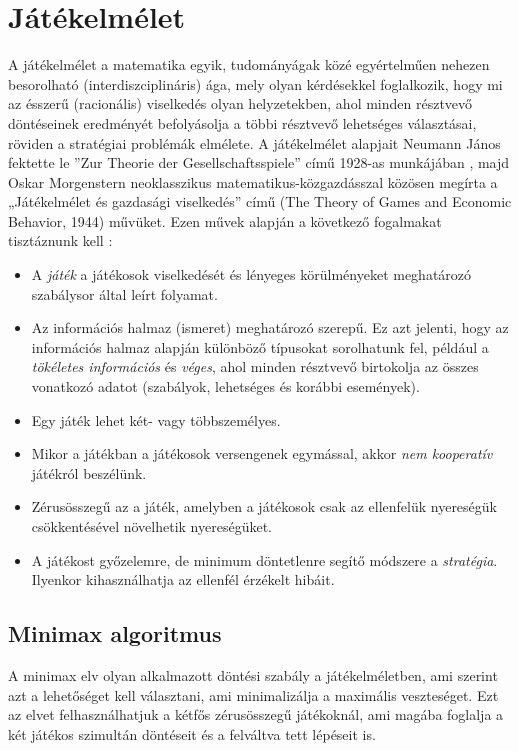 \documentclass[
]{thesis-ekf}
\theoremstyle{definition}
\theoremstyle{remark}
\begin{document}
\section{Játékelmélet}

A játékelmélet a matematika egyik, tudományágak közé egyértelműen nehezen besorolható (interdiszciplináris) ága, mely olyan kérdésekkel foglalkozik, hogy mi az ésszerű (racionális) viselkedés olyan helyzetekben, ahol minden résztvevő döntéseinek eredményét befolyásolja a többi résztvevő lehetséges választásai, röviden a stratégiai problémák elmélete. A játékelmélet alapjait Neumann János fektette le ''Zur Theorie der Gesellschaftsspiele'' című 1928-as munkájában \cite{Neumann}, majd Oskar Morgenstern neoklasszikus matematikus-közgazdásszal közösen megírta a „Játékelmélet és gazdasági viselkedés” című (The Theory of Games and Economic Behavior, 1944) művüket. \cite{Jatekelmelet,JatekelmeletEn} Ezen művek alapján a következő fogalmakat tisztáznunk kell \cite{NeumannOskar}:

\begin{itemize}
	\item A \emph{játék} a játékosok viselkedését és lényeges körülményeket meghatározó szabálysor által leírt folyamat.
	\item Az információs halmaz (ismeret) meghatározó szerepű. Ez azt jelenti, hogy az információs halmaz alapján különböző típusokat sorolhatunk fel, például a \emph{tökéletes információs} és \emph{véges}, ahol minden résztvevő birtokolja az összes vonatkozó adatot (szabályok, lehetséges és korábbi események).
	\item Egy játék lehet két- vagy többszemélyes.
	\item Mikor a játékban a játékosok versengenek egymással, akkor \emph{nem kooperatív} játékról beszélünk.
	\item Zérusösszegű az a játék, amelyben a játékosok csak az ellenfelük nyereségük csökkentésével növelhetik nyereségüket.
	\item A játékost győzelemre, de minimum döntetlenre segítő módszere a \emph{stratégia}. Ilyenkor kihasználhatja az ellenfél érzékelt hibáit.
\end{itemize} 

\subsection{Minimax algoritmus}

A minimax elv olyan alkalmazott döntési szabály a játékelméletben, ami szerint azt a lehetőséget kell választani, ami minimalizálja a maximális veszteséget. Ezt az elvet felhasználhatjuk a kétfős zérusösszegű játékoknál, ami magába foglalja a két játékos szimultán döntéseit és a felváltva tett lépéseit is. \cite{MiniMaxEnWiki}
\end{document}
